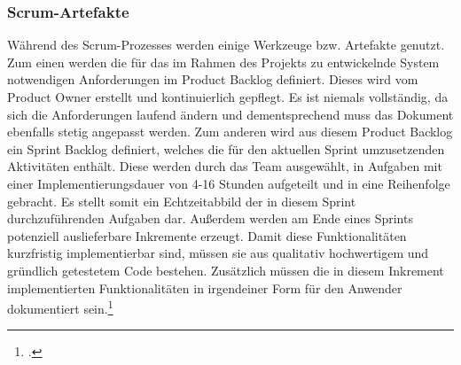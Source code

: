 \subsubsection{Scrum-Artefakte}
Während des Scrum-Prozesses werden einige Werkzeuge bzw. Artefakte genutzt. Zum einen werden die für das im Rahmen des Projekts zu entwickelnde System notwendigen Anforderungen im Product Backlog definiert. Dieses wird vom Product Owner erstellt und kontinuierlich gepflegt. Es ist niemals vollständig, da sich die Anforderungen laufend ändern und dementsprechend muss das Dokument ebenfalls stetig  angepasst werden. Zum anderen wird aus diesem Product Backlog ein Sprint Backlog definiert, welches die für den aktuellen Sprint umzusetzenden Aktivitäten enthält. Diese werden durch das Team ausgewählt, in Aufgaben mit einer Implementierungsdauer von 4-16 Stunden aufgeteilt und in eine Reihenfolge gebracht. Es stellt somit ein Echtzeitabbild der in diesem Sprint durchzuführenden Aufgaben dar. Außerdem werden am Ende eines Sprints potenziell auslieferbare Inkremente erzeugt. Damit diese Funktionalitäten kurzfristig implementierbar sind, müssen sie aus qualitativ hochwertigem und gründlich getestetem Code bestehen. Zusätzlich müssen die in diesem Inkrement implementierten Funktionalitäten in irgendeiner Form für den Anwender dokumentiert sein.\footcite[Vgl.][Seite 10-15]{schwabo} 